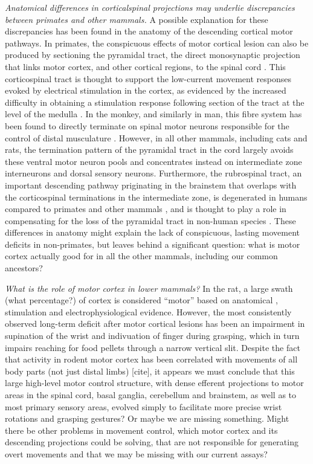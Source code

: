 \emph{Anatomical differences in corticalspinal projections may underlie discrepancies between primates and other mammals.}
A possible explanation for these discrepancies has been found in the anatomy of the descending cortical motor pathways. In primates, the conspicuous effects of motor cortical lesion can also be produced by sectioning the pyramidal tract, the direct monosynaptic projection that links motor cortex, and other cortical regions, to the spinal cord \cite{Tower1940,Lawrence1968}. This corticospinal tract is thought to support the low-current movement responses evoked by electrical stimulation in the cortex, as evidenced by the increased difficulty in obtaining a stimulation response following section of the tract at the level of the medulla \cite{Woolsey1972}. In the monkey, and similarly in man, this fibre system has been found to directly terminate on spinal motor neurons responsible for the control of distal musculature \cite{Leyton1917,Bernhard1954}. However, in all other mammals, including cats and rats, the termination pattern of the pyramidal tract in the cord largely avoids these ventral motor neuron pools and concentrates instead on intermediate zone interneurons \cite{Kuypers1981,Yang2003} and dorsal sensory neurons. Furthermore, the rubrospinal tract, an important descending pathway priginating in the brainstem that overlaps with the corticospinal terminations in the intermediate zone, is degenerated in humans compared to primates and other mammals \cite{Square1982}, and is thought to play a role in compensating for the loss of the pyramidal tract in non-human species \cite{Lawrence1968a}. These differences in anatomy might explain the lack of conspicuous, lasting movement deficits in non-primates, but leaves behind a significant question: what is motor cortex actually good for in all the other mammals, including our common ancestors?

\emph{What is the role of motor cortex in lower mammals?}
In the rat, a large swath (what percentage?) of cortex is considered ``motor'' based on anatomical \cite{Donoghue1982}, stimulation \cite{Donoghue1982,Neafsey1986} and electrophysiological evidence. However, the most consistently observed long-term deficit after motor cortical lesions has been an impairment in supination of the wrist and indivuation of finger during grasping, which in turn impairs reaching for food pellets through a narrow vertical slit. Despite the fact that activity in rodent motor cortex has been correlated with movements of all body parts (not just distal limbs) [cite], it appears we must conclude that this large high-level motor control structure, with dense efferent projections to motor areas in the spinal cord, basal ganglia, cerebellum and brainstem, as well as to most primary sensory areas, evolved simply to facilitate more precise wrist rotations and grasping gestures? Or maybe we are missing something. Might there be other problems in movement control, which motor cortex and its descending projections could be solving, that are not responsible for generating overt movements and that we may be missing with our current assays?


